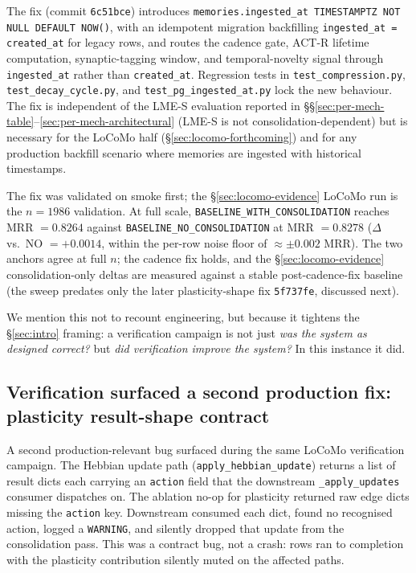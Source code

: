 \documentclass[11pt]{article}
\begin{document}
The fix (commit \texttt{6c51bce}) introduces
\texttt{memories.ingested\_at TIMESTAMPTZ NOT NULL DEFAULT NOW()},
with an idempotent migration backfilling
\texttt{ingested\_at = created\_at} for legacy rows, and routes the
cadence gate, ACT-R lifetime computation, synaptic-tagging window,
and temporal-novelty signal through \texttt{ingested\_at} rather
than \texttt{created\_at}.  Regression tests in
\texttt{test\_compression.py}, \texttt{test\_decay\_cycle.py}, and
\texttt{test\_pg\_ingested\_at.py} lock the new behaviour.  The fix
is independent of the LME-S evaluation reported in
\S\S\ref{sec:per-mech-table}--\ref{sec:per-mech-architectural}
(LME-S is not consolidation-dependent) but is necessary for the
LoCoMo half (\S\ref{sec:locomo-forthcoming}) and for any production
backfill scenario where memories are ingested with historical
timestamps.

The fix was validated on smoke first; the \S\ref{sec:locomo-evidence}
LoCoMo run is the $n = 1986$ validation.  At full scale,
\texttt{BASELINE\_WITH\_CONSOLIDATION} reaches MRR $= 0.8264$
against \texttt{BASELINE\_NO\_CONSOLIDATION} at MRR $= 0.8278$
($\Delta$ vs.\ NO $= +0.0014$, within the per-row noise floor of
$\approx \pm 0.002$ MRR).  The two anchors agree at full $n$; the
cadence fix holds, and the \S\ref{sec:locomo-evidence}
consolidation-only deltas are measured against a stable
post-cadence-fix baseline (the sweep predates only the later
plasticity-shape fix \texttt{5f737fe}, discussed next).

We mention this not to recount engineering, but because it tightens
the \S\ref{sec:intro} framing: a verification campaign is not just
\emph{was the system as designed correct?} but \emph{did
verification improve the system?}  In this instance it did.

\subsection{Verification surfaced a second production fix: plasticity result-shape contract}
\label{sec:plasticity-fix}

A second production-relevant bug surfaced during the same LoCoMo
verification campaign.  The Hebbian update path
(\texttt{apply\_hebbian\_update}) returns a list of result dicts each
carrying an \texttt{action} field that the downstream
\texttt{\_apply\_updates} consumer dispatches on.  The ablation
no-op for plasticity returned raw edge dicts missing the
\texttt{action} key.  Downstream consumed each dict, found no
recognised action, logged a \texttt{WARNING}, and silently dropped
that update from the consolidation pass.  This was a contract bug,
not a crash: rows ran to completion with the plasticity
contribution silently muted on the affected paths.
\end{document}
